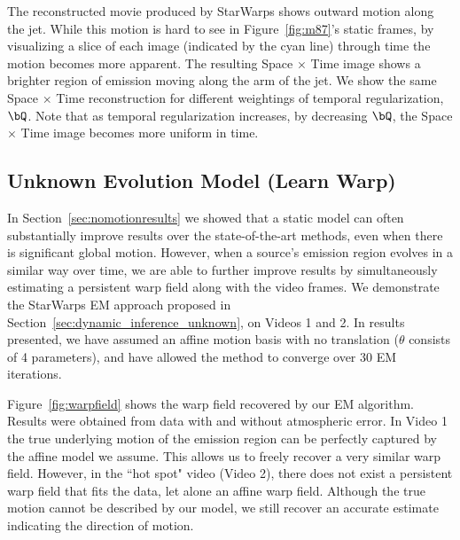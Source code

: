 The reconstructed movie produced by StarWarps shows outward motion along the jet. While this motion is hard to see in Figure~\ref{fig:m87}'s static frames, by visualizing a slice of each image (indicated by the cyan line) through time the motion becomes more apparent. The resulting Space $\times$ Time image shows a brighter region of emission moving along the arm of the jet. We show the same Space $\times$ Time reconstruction for different weightings of temporal regularization, $\bQ$. Note that as temporal regularization increases, by decreasing $\bQ$, the Space $\times$ Time image becomes more uniform in time. 
 
\subsection{Unknown Evolution  Model (Learn Warp)}




In Section~\ref{sec:nomotionresults} we showed that a static model can often substantially improve results over the state-of-the-art methods, even when there is significant global motion. However, when a source's emission region evolves in a similar way over time, we are able to further improve results by simultaneously estimating a persistent warp field along with the video frames.
We demonstrate the StarWarps EM approach proposed in Section~\ref{sec:dynamic_inference_unknown}, on Videos 1 and 2. In results presented, we have assumed an affine motion basis with no translation ($\theta$ consists of 4 parameters), and have allowed the method to converge over 30 EM iterations. %

Figure~\ref{fig:warpfield} shows the warp field recovered by our EM algorithm. 
Results were obtained from data with and without atmospheric error. In Video 1 the true underlying motion of the emission region can be perfectly captured by the affine model we assume. This allows us to freely recover a very similar warp field. 
However, in the ``hot spot" video (Video 2), there does not exist a persistent warp field that fits the data, let alone an affine warp field. Although the true motion cannot be described by our model, we still recover an accurate estimate indicating the direction of motion. 


